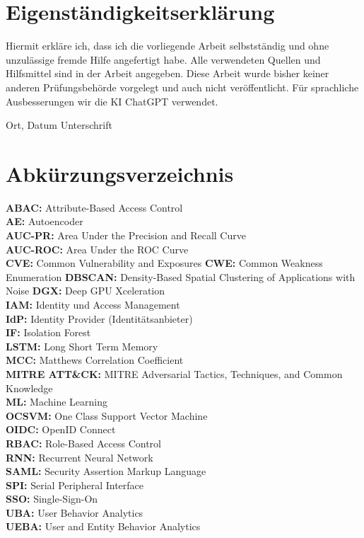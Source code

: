 \documentclass[a4paper,12pt]{article}
\let\footnote=\endnote
\begin{document}
	\section*{Eigenständigkeitserklärung}
	Hiermit erkläre ich, dass ich die vorliegende Arbeit selbstständig und ohne unzulässige fremde Hilfe angefertigt habe.  
	Alle verwendeten Quellen und Hilfsmittel sind in der Arbeit angegeben.  
	Diese Arbeit wurde bisher keiner anderen Prüfungsbehörde vorgelegt und auch nicht veröffentlicht. Für sprachliche Ausbesserungen wir die KI ChatGPT \footnote{https://chatgpt.com/}verwendet.
	
	\vspace{2cm}
	
	\noindent Ort, Datum \hfill Unterschrift
	\newpage
	\tableofcontents
	\newpage
	\listoffigures
	\newpage
	\listoftables
	\newpage
	
	\section*{Abkürzungsverzeichnis}
	
	\textbf{ABAC:} Attribute-Based Access Control \\[1em]
	\textbf{AE:} Autoencoder \\[1em]
	\textbf{AUC-PR:} Area Under the Precision and Recall Curve \\[1em]
	\textbf{AUC-ROC:} Area Under the ROC Curve \\[1em]
	\textbf{CVE:} Common Vulnerability and Exposures
	\textbf{CWE:} Common Weakness Enumeration
	\textbf{DBSCAN:} Density-Based Spatial Clustering of Applications with Noise
	\textbf{DGX:} Deep GPU Xceleration \\[1em]
	\textbf{IAM:} Identity und Access Management \\[1em]
	\textbf{IdP:} Identity Provider (Identitätsanbieter) \\[1em]
	\textbf{IF:} Isolation Forest \\[1em]
	\textbf{LSTM:} Long Short Term Memory \\[1em]
	\textbf{MCC:} Matthews Correlation Coefficient \\[1em]
	\textbf{MITRE ATT\&CK: } MITRE Adversarial Tactics, Techniques, 
		and Common Knowledge \\[1em]
	\textbf{ML:} Machine Learning \\[1em]
	\textbf{OCSVM:} One Class Support Vector Machine \\[1em]
	\textbf{OIDC:} OpenID Connect \\[1em]
	\textbf{RBAC:} Role-Based Access Control \\[1em]
	\textbf{RNN:} Recurrent Neural Network \\[1em]
	\textbf{SAML:} Security Assertion Markup Language \\[1em]
	\textbf {SPI:} Serial Peripheral Interface \\[1em]
	\textbf{SSO:} Single-Sign-On \\[1em]
	\textbf {UBA:} User Behavior Analytics \\[1em]
	\textbf {UEBA:} User and Entity Behavior Analytics \\[1em]
	
\end{document}
